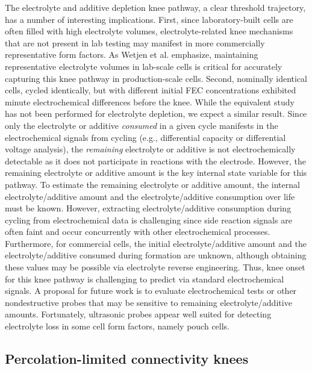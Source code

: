 \documentclass[journal=jpclcd,manuscript=article]{achemso}
\begin{document}
The electrolyte and additive depletion knee pathway, a clear threshold trajectory, has a number of interesting implications.
First, since laboratory-built cells are often filled with high electrolyte volumes, electrolyte-related knee mechanisms that are not present in lab testing may manifest in more commercially representative form factors.
As Wetjen et al.\cite{wetjen_differentiating_2017} emphasize,
maintaining representative electrolyte volumes in lab-scale cells is critical for accurately capturing this knee pathway in production-scale cells.
Second, nominally identical cells, cycled identically, but with different initial FEC concentrations exhibited minute electrochemical differences before the knee.\cite{jung_consumption_2016}
While the equivalent study has not been performed for electrolyte depletion, we expect a similar result.
Since only the electrolyte or additive \textit{consumed} in a given cycle manifests in the electrochemical signals from cycling (e.g., differential capacity or differential voltage analysis), the \textit{remaining} electrolyte or additive is not electrochemically detectable as it does not participate in reactions with the electrode.
However, the remaining electrolyte or additive amount is the key internal state variable for this pathway.
To estimate the remaining electrolyte or additive amount, the internal electrolyte/additive amount and the electrolyte/additive consumption over life must be known.
However, extracting electrolyte/additive consumption during cycling from electrochemical data is challenging since side reaction signals are often faint and occur concurrently with other electrochemical processes.
Furthermore, for commercial cells, the initial electrolyte/additive amount and the electrolyte/additive consumed during formation are unknown, although obtaining these values may be possible via electrolyte reverse engineering.
Thus, knee onset for this knee pathway is challenging to predict via standard electrochemical signals.
A proposal for future work is to evaluate electrochemical tests or other nondestructive probes that may be sensitive to remaining electrolyte/additive amounts.
Fortunately, ultrasonic probes appear well suited for detecting electrolyte loss in some cell form factors, namely pouch cells.\cite{knehr_understanding_2018, deng_ultrasonic_2020}

\subsection{Percolation-limited connectivity knees}
\end{document}
